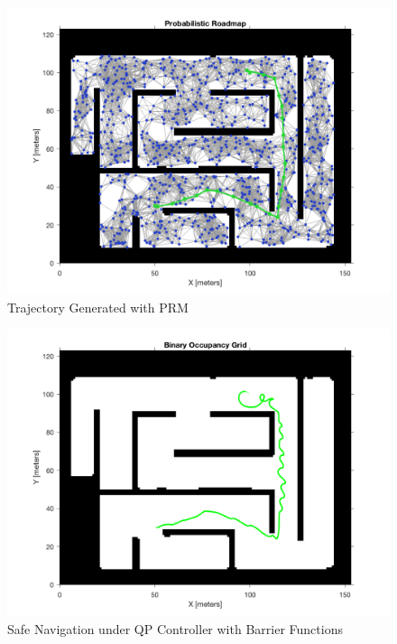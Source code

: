 \documentclass[journal]{IEEEconf}
\begin{document}
\begin{figure}[h!]
\centering
\includegraphics[scale=0.18]{final_prm.png} 
\caption{Trajectory Generated with PRM\label{fig:prm}} 
\end{figure}
%
%
\begin{figure}[h!]
\centering
\includegraphics[scale=0.18]{thick_plot.png} 
\caption{Safe Navigation under QP Controller with Barrier Functions\label{fig:prm_works}}
\end{figure}
\end{document}
